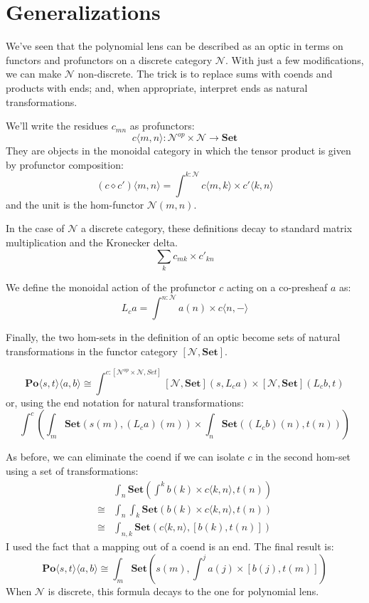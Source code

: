\documentclass[11pt]{amsart}
\begin{document}
\section{Generalizations}

We've seen that the polynomial lens can be described as an optic in terms on functors and profunctors on a discrete category $\mathcal{N}$. With just a few modifications, we can make $\mathcal{N}$ non-discrete. The trick is to replace sums with coends and products with ends; and, when appropriate, interpret ends as natural transformations. 

We'll write the residues $c_{m n}$ as profunctors:
\[ c \langle m, n \rangle \colon \mathcal{N}^{op} \times \mathcal{N} \to \mathbf{Set} \]
They are objects in the monoidal category in which the tensor product is given by profunctor composition:
\[ (c \diamond c') \langle m, n \rangle = \int^{k \colon \mathcal{N}} c \langle m, k \rangle \times c' \langle k, n \rangle \]
and the unit is the hom-functor $\mathcal{N}(m, n)$. 

In the case of $\mathcal{N}$ a discrete category, these definitions decay to standard matrix multiplication and the Kronecker delta.
\[ \sum_k c_{m k} \times c'_{k n} \]

We define the monoidal action of the profunctor $c$ acting on a co-presheaf $a$ as:
\[ L_c a = \int^{n \colon \mathcal{N}} a(n) \times c \langle n, - \rangle \]

Finally, the two hom-sets in the definition of an optic become sets of natural transformations in the functor category $ [\mathcal{N}, \mathbf{Set}] $. 

\[ \mathbf{Po}\langle s, t\rangle \langle a, b\rangle \cong \int^{c \colon [\mathcal{N}^{op} \times \mathcal{N}, Set]}   [\mathcal{N}, \mathbf{Set}]  \left(s, L_c a\right)  \times  [\mathcal{N}, \mathbf{Set}]  \left(L_c b, t\right) \]
or, using the end notation for natural transformations:
\[ \int^{c} \left( \int_m \mathbf{Set}\left(s(m), (L_c a)(m)\right)  \times  \int_n \mathbf{Set} \left((L_c b)(n), t(n)\right) \right)\]

As before, we can eliminate the coend if we can isolate $c$ in the second hom-set using a set of transformations:
\begin{align*}
 & \int_n  \mathbf{Set} \left(\int^k b(k) \times c\langle k, n \rangle , t(n) \right)
 \\
\cong & \int_n \int_k \mathbf{Set}\left( b(k) \times c\langle k, n \rangle , t (n)\right)
 \\
\cong &  \int_{n, k} \mathbf{Set}\left(c\langle k, n \rangle , [b(k), t (n)]\right)
 \end{align*}
I used the fact that a mapping out of a coend is an end. The final result is:
\[ \mathbf{Po}\langle s, t\rangle \langle a, b\rangle \cong  
\int_m \mathbf{Set}\left(s(m), \int^j a(j) \times [b(j), t(m)] \right)\]
When $\mathcal{N}$ is discrete, this formula decays to the one for polynomial lens. 
\end{document}
